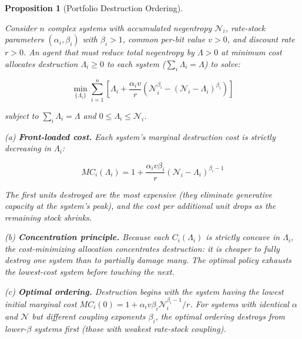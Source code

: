 \documentclass[11pt]{article}
\theoremstyle{plain}
\newtheorem{proposition}[theorem]{Proposition}
\theoremstyle{definition}
\theoremstyle{remark}
\begin{document}
\begin{proposition}[Portfolio Destruction Ordering]
\label{prop-portfolio-destruction-ordering}

Consider $n$ complex systems with accumulated negentropy $\mathcal{N}_i$, rate-stock parameters $(\alpha_i, \beta_i)$ with $\beta_i > 1$, common per-bit value $v > 0$, and discount rate $r > 0$. An agent that must reduce total negentropy by $\Lambda > 0$ at minimum cost allocates destruction $\Lambda_i \geq 0$ to each system ($\sum_i \Lambda_i = \Lambda$) to solve:

$$\min_{\{\Lambda_i\}} \sum_{i=1}^n \left[\Lambda_i + \frac{\alpha_i v}{r}\left(\mathcal{N}_i^{\beta_i} - (\mathcal{N}_i - \Lambda_i)^{\beta_i}\right)\right]$$

subject to $\sum_i \Lambda_i = \Lambda$ and $0 \leq \Lambda_i \leq \mathcal{N}_i$.

(a) \textbf{Front-loaded cost.} Each system's marginal destruction cost is strictly \emph{decreasing} in $\Lambda_i$:

$$MC_i(\Lambda_i) = 1 + \frac{\alpha_i v \beta_i}{r}(\mathcal{N}_i - \Lambda_i)^{\beta_i - 1}$$

The first units destroyed are the most expensive (they eliminate generative capacity at the system's peak), and the cost per additional unit drops as the remaining stock shrinks.

(b) \textbf{Concentration principle.} Because each $C_i(\Lambda_i)$ is strictly concave in $\Lambda_i$, the cost-minimizing allocation concentrates destruction: it is cheaper to fully destroy one system than to partially damage many. The optimal policy exhausts the lowest-cost system before touching the next.

(c) \textbf{Optimal ordering.} Destruction begins with the system having the lowest initial marginal cost $MC_i(0) = 1 + \alpha_i v \beta_i \mathcal{N}_i^{\beta_i - 1}/r$. For systems with identical $\alpha$ and $\mathcal{N}$ but different coupling exponents $\beta_i$, the optimal ordering destroys from lower-$\beta$ systems first (those with weakest rate-stock coupling).
\end{proposition}
\end{document}
